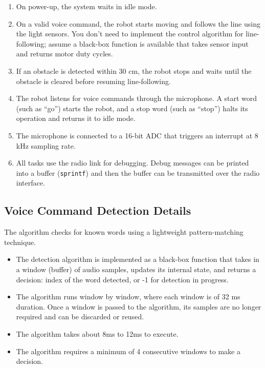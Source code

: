 \begin{enumerate}[noitemsep, topsep=0pt]
    \item On power-up, the system waits in idle mode.

    \item On a valid voice command, the robot starts moving and follows the line using the light sensors.
          You don't need to implement the control algorithm for line-following; assume a black-box function is available that takes sensor input and returns motor duty cycles.

    \item If an obstacle is detected within 30 cm, the robot stops and waits until the obstacle is cleared before resuming line-following.

    \item The robot listens for voice commands through the microphone.
          A start word (such as ``go'') starts the robot, and a stop word (such as ``stop'') halts its operation and returns it to idle mode.

    \item The microphone is connected to a 16-bit ADC that triggers an interrupt at 8 kHz sampling rate.

    \item All tasks use the radio link for debugging.
          Debug messages can be printed into a buffer (\texttt{sprintf}) and then the buffer can be transmitted over the radio interface.
\end{enumerate}

\vspace*{-1.5em}
\subsection*{Voice Command Detection Details}
\vspace*{-0.5em}

The algorithm checks for known words using a lightweight pattern-matching technique.

\begin{itemize}[noitemsep, topsep=0pt]
    \item The detection algorithm is implemented as a black-box function that takes in a window (buffer) of audio samples, updates its internal state, and returns a decision: index of the word detected, or -1 for detection in progress.

    \item The algorithm runs window by window, where each window is of 32 ms duration.
          Once a window is passed to the algorithm, its samples are no longer required and can be discarded or reused.

    \item The algorithm takes about 8ms to 12ms to execute.

    \item The algorithm requires a minimum of 4 consecutive windows to make a decision.
\end{itemize}
